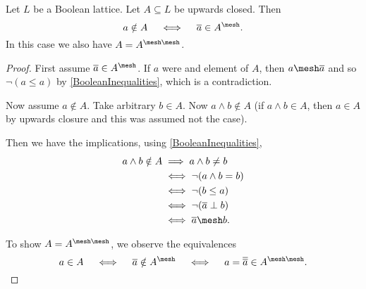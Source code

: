 \begin{proposition} \label{complementInIsotoneGrill}
Let $L$ be a Boolean lattice. Let $A \subseteq L$ be upwards closed. Then
\[ a \notin A \quad\iff\quad \overline{a} \in A^\mesh. \]
In this case we also have $A = A^{\mesh\mesh}$.
\end{proposition}
\begin{proof}
First assume $\overline{a} \in A^\mesh$. If $a$ were and element of $A$, then $a\mesh \overline{a}$ and so $\neg(a\leq a)$ by \ref{BooleanInequalities}, which is a contradiction.

Now assume $a \notin A$. Take arbitrary $b\in A$. Now $a\wedge b \notin A$ (if $a\wedge b\in A$, then $a\in A$ by upwards closure and this was assumed not the case).

Then we have the implications, using \ref{BooleanInequalities},
\begin{align*}
a\wedge b\notin A &\implies a\wedge b \neq b \\
&\iff \neg(a\wedge b = b) \\
&\iff \neg(b\leq a) \\
&\iff \neg(\overline{a}\perp b) \\
&\iff \overline{a}\mesh b.
\end{align*}

To show $A = A^{\mesh\mesh}$, we observe the equivalences
\[ a\in A \quad\iff\quad \overline{a} \notin A^\mesh \quad\iff\quad a = \overline{\overline{a}} \in A^{\mesh\mesh}. \]
\end{proof}


